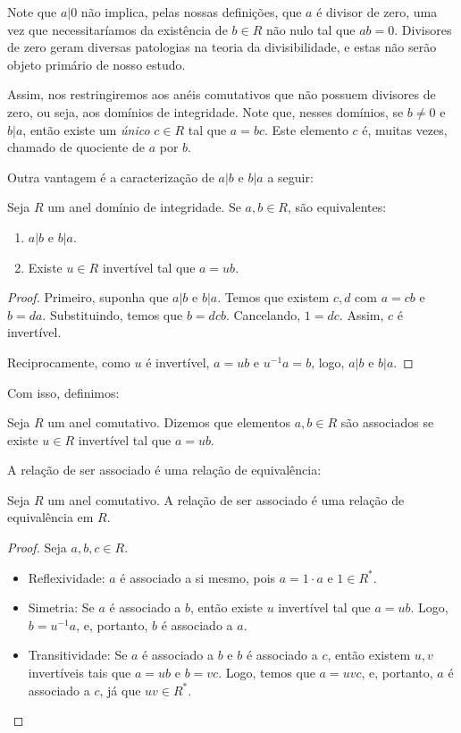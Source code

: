Note que $a|0$ não implica, pelas nossas definições, que $a$ é divisor de zero, uma vez que necessitaríamos da existência de $b \in R$ não nulo tal que $ab=0$.
Divisores de zero geram diversas patologias na teoria da divisibilidade, e estas não serão objeto primário de nosso estudo.

Assim, nos restringiremos aos anéis comutativos que não possuem divisores de zero, ou seja, aos domínios de integridade.
Note que, nesses domínios, se $b\neq 0$ e $b|a$, então existe um \emph{único} $c\in R$ tal que $a=bc$.
Este elemento $c$ é, muitas vezes, chamado de quociente de $a$ por $b$.

Outra vantagem é a caracterização de $a|b$ e $b|a$ a seguir:
\begin{prop}
    Seja $R$ um anel domínio de integridade. Se $a, b\in R$, são equivalentes:

    \begin{enumerate}
        \item $a|b$ e $b|a$.
        \item Existe $u \in R$ invertível tal que $a=ub$.
    \end{enumerate}

    \begin{proof}
        Primeiro, suponha que $a|b$ e $b|a$.
        Temos que existem $c, d$ com $a=cb$ e $b=da$.
        Substituindo, temos que $b=dcb$. Cancelando, $1=dc$. Assim, $c$ é invertível.

        Reciprocamente, como $u$ é invertível, $a=ub$ e $u^{-1}a=b$, logo, $a|b$ e $b|a$.
    \end{proof}
\end{prop}

Com isso, definimos:

\begin{definition}
Seja $R$ um anel comutativo.
Dizemos que elementos $a, b \in R$ são associados se existe $u \in R$ invertível tal que $a=ub$.
\end{definition}

A relação de ser associado é uma relação de equivalência:

\begin{lemma}
    Seja $R$ um anel comutativo. A relação de ser associado é uma relação de equivalência em $R$.
\end{lemma}
\begin{proof}
    Seja $a, b, c \in R$.
    \begin{itemize}
        \item Reflexividade: $a$ é associado a si mesmo, pois $a=1\cdot a$ e $1 \in R^*$.
        \item Simetria: Se $a$ é associado a $b$, então existe $u$ invertível tal que $a=ub$. Logo, $b=u^{-1}a$, e, portanto, $b$ é associado a $a$.
        \item Transitividade: Se $a$ é associado a $b$ e $b$ é associado a $c$, então existem $u, v$ invertíveis tais que $a=ub$ e $b=vc$.
        Logo, temos que $a=uvc$, e, portanto, $a$ é associado a $c$, já que $uv\in R^*$.
    \end{itemize}
\end{proof}

